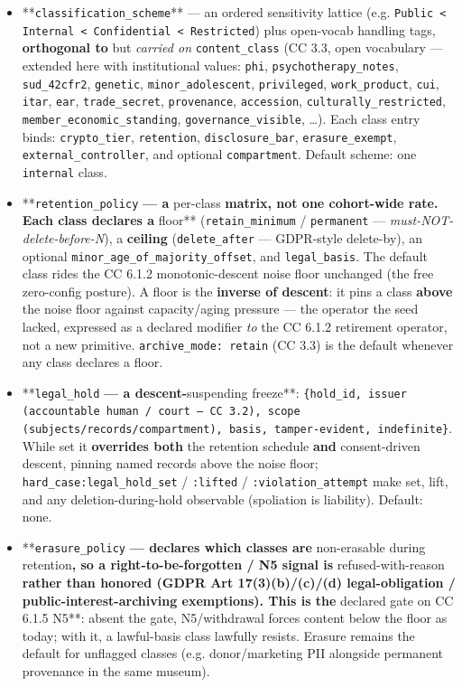 \documentclass[11pt]{article}
\begin{document}
\begin{itemize}\setlength\itemsep{0pt}
\item **\texttt{classification\_scheme}** — an ordered sensitivity lattice (e.g. \texttt{Public < Internal < Confidential < Restricted}) plus open-vocab handling tags, \textbf{orthogonal to} but \textit{carried on} \texttt{content\_class} (CC 3.3, open vocabulary — extended here with institutional values: \texttt{phi}, \texttt{psychotherapy\_notes}, \texttt{sud\_42cfr2}, \texttt{genetic}, \texttt{minor\_adolescent}, \texttt{privileged}, \texttt{work\_product}, \texttt{cui}, \texttt{itar}, \texttt{ear}, \texttt{trade\_secret}, \texttt{provenance}, \texttt{accession}, \texttt{culturally\_restricted}, \texttt{member\_economic\_standing}, \texttt{governance\_visible}, …). Each class entry binds: \texttt{crypto\_tier}, \texttt{retention}, \texttt{disclosure\_bar}, \texttt{erasure\_exempt}, \texttt{external\_controller}, and optional \texttt{compartment}. Default scheme: one \texttt{internal} class.
\item **\texttt{retention\_policy}\textbf{ — a }per-class\textbf{ matrix, not one cohort-wide rate. Each class declares a }floor** (\texttt{retain\_minimum} / \texttt{permanent} — \textit{must-NOT-delete-before-N}), a \textbf{ceiling} (\texttt{delete\_after} — GDPR-style delete-by), an optional \texttt{minor\_age\_of\_majority\_offset}, and \texttt{legal\_basis}. The default class rides the CC 6.1.2 monotonic-descent noise floor unchanged (the free zero-config posture). A floor is the \textbf{inverse of descent}: it pins a class \textbf{above} the noise floor against capacity/aging pressure — the operator the seed lacked, expressed as a declared modifier \textit{to} the CC 6.1.2 retirement operator, not a new primitive. \texttt{archive\_mode: retain} (CC 3.3) is the default whenever any class declares a floor.
\item **\texttt{legal\_hold}\textbf{ — a descent-}suspending freeze**: \texttt{\{hold\_id, issuer (accountable human / court — CC 3.2), scope (subjects/records/compartment), basis, tamper-evident, indefinite\}}. While set it \textbf{overrides both} the retention schedule \textbf{and} consent-driven descent, pinning named records above the noise floor; \texttt{hard\_case:legal\_hold\_set} / \texttt{:lifted} / \texttt{:violation\_attempt} make set, lift, and any deletion-during-hold observable (spoliation is liability). Default: none.
\item **\texttt{erasure\_policy}\textbf{ — declares which classes are }non-erasable during retention\textbf{, so a right-to-be-forgotten / N5 signal is }refused-with-reason\textbf{ rather than honored (GDPR Art 17(3)(b)/(c)/(d) legal-obligation / public-interest-archiving exemptions). This is the }declared gate on CC 6.1.5 N5**: absent the gate, N5/withdrawal forces content below the floor as today; with it, a lawful-basis class lawfully resists. Erasure remains the default for unflagged classes (e.g. donor/marketing PII alongside permanent provenance in the same museum).

\end{itemize}
\end{document}
